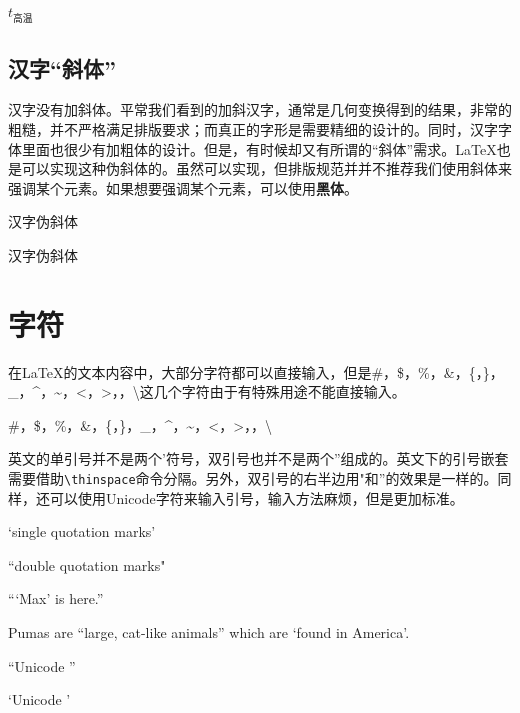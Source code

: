 \begin{codeshow}
$t_{\text{高温}}$
\end{codeshow}

\subsection{汉字“斜体”}
汉字没有加斜体。平常我们看到的加斜汉字，通常是几何变换得到的结果，非常的粗糙，并不严格满足排版要求；而真正的字形是需要精细的设计的。同时，汉字字体里面也很少有加粗体的设计。但是，有时候却又有所谓的“斜体”需求。\LaTeX 也是可以实现这种伪斜体的。虽然可以实现，但排版规范并并不推荐我们使用斜体来强调某个元素。如果想要强调某个元素，可以使用\textbf{黑体}。

\begin{center}
{汉字伪斜体}
\end{center}

\begin{latex}
{汉字伪斜体}
\end{latex}

\section{字符}

在\LaTeX 的文本内容中，大部分字符都可以直接输入，但是\#，\$，\%，\&，\{，\}，\_，\^{}，\~{}，\textless，\textgreater，\textbar，\textbackslash 这几个字符由于有特殊用途不能直接输入。

\begin{codeshow}
\#，\$，\%，\&，\{，\}，\_，\^{}，\~{}，\textless，\textgreater，\textbar，\textbackslash
\end{codeshow}


英文的单引号并不是两个'符号，双引号也并不是两个''组成的。英文下的引号嵌套需要借助\lstinline{\thinspace}命令分隔。另外，双引号的右半边用"和''的效果是一样的。同样，还可以使用Unicode字符来输入引号，输入方法麻烦，但是更加标准。

\begin{codeshow}
`single quotation marks'\par
``double quotation marks"\par
``\thinspace`Max' is here.''\par
Pumas are ``large, cat-like animals'' which are `found in America'.\par
\textquotedblleft Unicode \textquotedblright \par
\textquoteleft Unicode \textquoteright
\end{codeshow}

